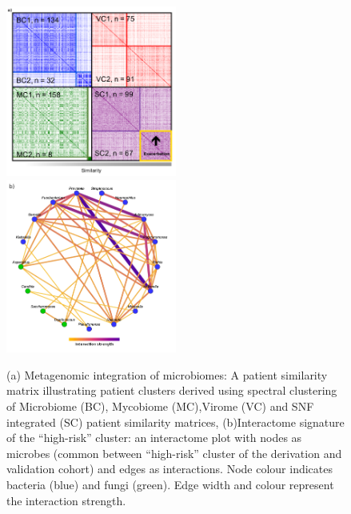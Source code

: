 \begin{figure}[!htb]
	\centering
	\includegraphics[width=0.5\textwidth]{image/meta_validation1.png}
	\includegraphics[width=0.5\textwidth]{image/meta_validation2.png}
	\caption{(a) Metagenomic integration of microbiomes: A patient similarity matrix illustrating patient clusters derived using spectral clustering of Microbiome (BC), Mycobiome (MC),Virome (VC) and SNF integrated (SC) patient similarity matrices, (b)Interactome signature of the “high-risk” cluster: an interactome plot with nodes as microbes (common between “high-risk” cluster of the derivation and validation cohort) and edges as interactions. Node colour indicates bacteria (blue) and fungi (green). Edge width and colour represent the interaction strength. }
	\label{fig6}
\end{figure}


